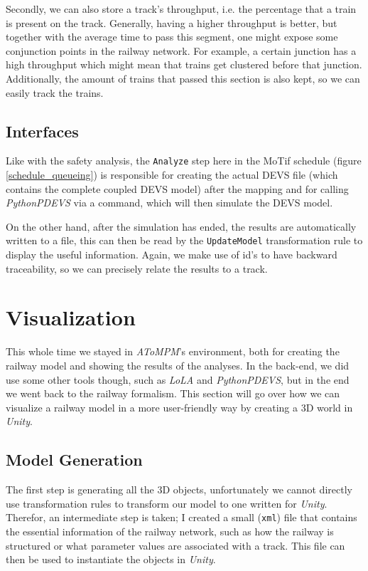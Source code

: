 \documentclass{article}
\begin{document}
Secondly, we can also store a track's throughput, i.e. the percentage that a train is present on the track. Generally, having a higher throughput is better, but together with the average time to pass this segment, one might expose some conjunction points in the railway network. For example, a certain junction has a high throughput which might mean that trains get clustered before that junction. Additionally, the amount of trains that passed this section is also kept, so we can easily track the trains.

\subsection{Interfaces}

Like with the safety analysis, the \texttt{Analyze} step here in the MoTif schedule (figure \ref{schedule_queueing}) is responsible for creating the actual DEVS file (which contains the complete coupled DEVS model) after the mapping and for calling \textit{PythonPDEVS} via a command, which will then simulate the DEVS model.

On the other hand, after the simulation has ended, the results are automatically written to a file, this can then be read by the \texttt{UpdateModel} transformation rule to display the useful information. Again, we make use of id's to have backward traceability, so we can precisely relate the results to a track.

\section{Visualization}

This whole time we stayed in \textit{AToMPM}'s environment, both for creating the railway model and showing the results of the analyses. In the back-end, we did use some other tools though, such as \textit{LoLA} and \textit{PythonPDEVS}, but in the end we went back to the railway formalism. This section will go over how we can visualize a railway model in a more user-friendly way by creating a 3D world in \textit{Unity}.

\subsection{Model Generation}

The first step is generating all the 3D objects, unfortunately we cannot directly use transformation rules to transform our model to one written for \textit{Unity}. Therefor, an intermediate step is taken; I created a small (\texttt{xml}) file that contains the essential information of the railway network, such as how the railway is structured or what parameter values are associated with a track. This file can then be used to instantiate the objects in \textit{Unity}.
\end{document}
